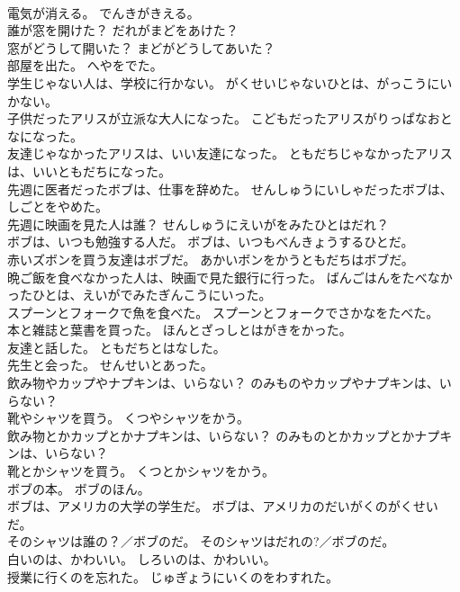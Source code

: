 \documentclass[8pt]{extreport}
\begin{document}
\begin{CJK}{UTF8}{min}
\\	電気が消える。	でんきがきえる。 
\\	誰が窓を開けた？	だれがまどをあけた？ 
\\	窓がどうして開いた？	まどがどうしてあいた？ 
\\	部屋を出た。	へやをでた。 
\\	学生じゃない人は、学校に行かない。	がくせいじゃないひとは、がっこうにいかない。 
\\	子供だったアリスが立派な大人になった。	こどもだったアリスがりっぱなおとなになった。 
\\	友達じゃなかったアリスは、いい友達になった。	ともだちじゃなかったアリスは、いいともだちになった。 
\\	先週に医者だったボブは、仕事を辞めた。	せんしゅうにいしゃだったボブは、しごとをやめた。 
\\	先週に映画を見た人は誰？	せんしゅうにえいがをみたひとはだれ？ 
\\	ボブは、いつも勉強する人だ。	ボブは、いつもべんきょうするひとだ。 
\\	赤いズボンを買う友達はボブだ。	あかいボンをかうともだちはボブだ。 
\\	晩ご飯を食べなかった人は、映画で見た銀行に行った。	ばんごはんをたべなかったひとは、えいがでみたぎんこうにいった。 
\\	スプーンとフォークで魚を食べた。	スプーンとフォークでさかなをたべた。 
\\	本と雑誌と葉書を買った。	ほんとざっしとはがきをかった。 
\\	友達と話した。	ともだちとはなした。 
\\	先生と会った。	せんせいとあった。 
\\	飲み物やカップやナプキンは、いらない？	のみものやカップやナプキンは、いらない？ 
\\	靴やシャツを買う。	くつやシャツをかう。 
\\	飲み物とかカップとかナプキンは、いらない？	のみものとかカップとかナプキンは、いらない？ 
\\	靴とかシャツを買う。	くつとかシャツをかう。 
\\	ボブの本。	ボブのほん。 
\\	ボブは、アメリカの大学の学生だ。	ボブは、アメリカのだいがくのがくせいだ。 
\\	そのシャツは誰の？／ボブのだ。	そのシャツはだれの?／ボブのだ。 
\\	白いのは、かわいい。	しろいのは、かわいい。 
\\	授業に行くのを忘れた。	じゅぎょうにいくのをわすれた。 

\end{CJK}
\end{document}
